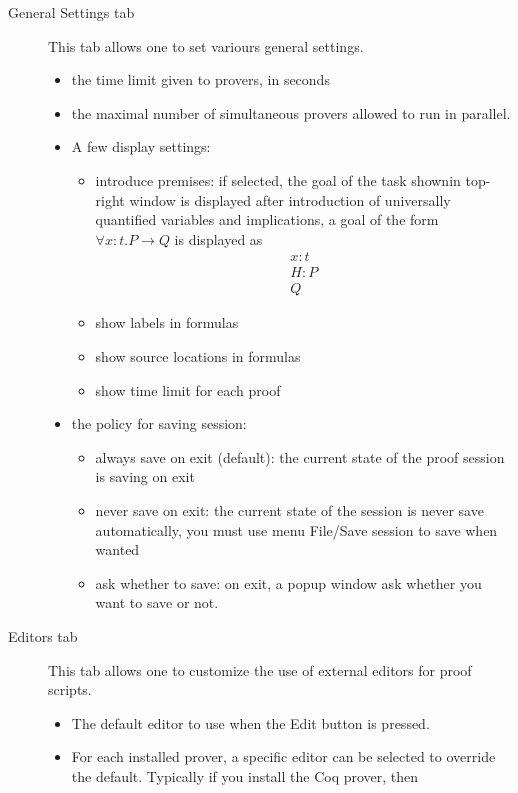 \begin{description}
\item[\textsf{General Settings} tab] This tab allows one to set
  variours general settings.
\begin{itemize}
\item the time limit given to provers, in seconds
\item the maximal number of simultaneous provers allowed to run in
  parallel.
\item A few display settings:
  \begin{itemize}
  \item introduce premises: if selected, the goal of the task shownin
    top-right window is displayed after introduction of universally
    quantified variables and implications, \eg a goal of the form
    $\forall x: t. P \rightarrow Q$ is displayed as
    \[
    \begin{array}{l}
      x : t \\
      H : P \\
      \hline
      Q
    \end{array}
    \]
  \item show labels in formulas
  \item show source locations in formulas
  \item show time limit for each proof
  \end{itemize}
\item the policy for saving session:
  \begin{itemize}
  \item always save on exit (default): the current state of the proof session is saving on exit
  \item never save on exit: the current state of the session is never save automatically, you must use menu \textsf{File/Save session} to save when wanted
  \item ask whether to save: on exit, a popup window ask whether you
    want to save or not.
  \end{itemize}
\end{itemize}
\item[\textsf{Editors} tab] This tab allows one to customize the use
  of external editors for proof scripts.
\begin{itemize}
\item The default editor to use when the \textsf{Edit} button is
  pressed.
\item For each installed prover, a specific editor can be selected to
  override the default. Typically if you install the Coq prover, then

\end{itemize}
\end{description}
